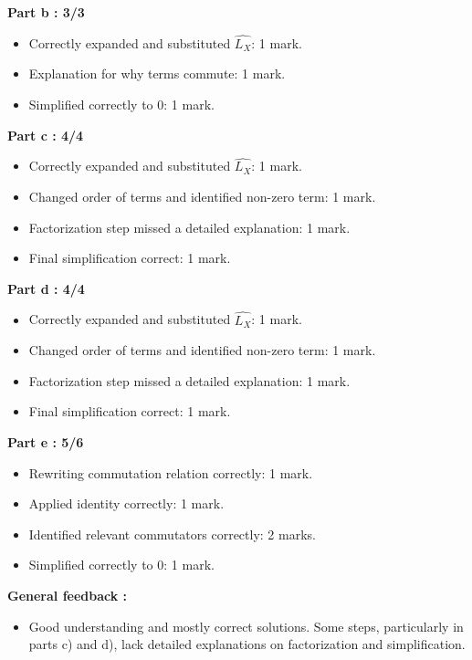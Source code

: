 \documentclass[a4paper,11pt]{article}
\begin{document}
\textbf{Part b : 3/3}

\begin{itemize}
    \item Correctly expanded and substituted $\hat{L_X}$: 1 mark.
    \item Explanation for why terms commute: 1 mark.
    \item Simplified correctly to 0: 1 mark.
\end{itemize}


\textbf{Part c : 4/4}

\begin{itemize}
    \item Correctly expanded and substituted $\hat{L_X}$: 1 mark.
    \item Changed order of terms and identified non-zero term: 1 mark.
    \item Factorization step missed a detailed explanation: 1 mark.
    \item Final simplification correct: 1 mark.
\end{itemize}


\textbf{Part d : 4/4}

\begin{itemize}
    \item Correctly expanded and substituted $\hat{L_X}$: 1 mark.
    \item Changed order of terms and identified non-zero term: 1 mark.
    \item Factorization step missed a detailed explanation: 1 mark.
    \item Final simplification correct: 1 mark.
\end{itemize}



\textbf{Part e : 5/6}

\begin{itemize}
    \item Rewriting commutation relation correctly: 1 mark.
    \item Applied identity correctly: 1 mark.
    \item Identified relevant commutators correctly: 2 marks.
    \item Simplified correctly to 0: 1 mark.
\end{itemize}


\textbf{General feedback :}

\begin{itemize}
    \item Good understanding and mostly correct solutions. Some steps, particularly in parts c) and d), lack detailed explanations on factorization and simplification.
\end{itemize}
\end{document}
